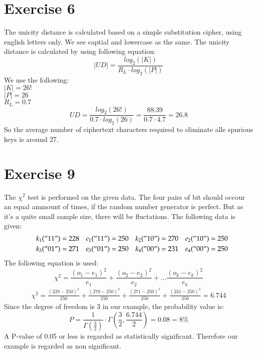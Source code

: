 \documentclass[a4paper,12pt]{article}
\begin{document}
\section*{Exercise 6}
The unicity distance is calculated based on a simple substitution cipher, using english letters only. We see captial and lowercase as the same. The unicity distance is calculated by using following equation:
\begin{equation}
|UD| = \frac{log_2(|K|)}{R_L  \cdot log_2(|P|)}
\end{equation}
We use the following:\\
$ |K| = 26!$\\
$ |P| = 26$\\
$ R_L = 0.7$\\	
\begin{equation}
UD=\frac{log_2(26!)}{0.7  \cdot log_2(26)}= \frac{88.39}{0.7 \cdot 4.7} = 26.8
\end{equation}
So the average number of ciphertext characters required to eliminate alle spurious keys is around 27.
\section*{Exercise 9}
The $ \chi^2 $ test is performed on the given data. The four pairs of bit should occour an equal ammount of times, if the random number generator is perfect. But as it's a quite small sample size, there will be fluctations. The following data is given:
\begin{align*}
k_1("11") = 228 \quad e_1("11") =250 \quad k_2("10") = 270 \quad e_2("10") =250 \\ \quad k_3("01") = 271 \quad e_3("01") =250 \quad k_4("00") = 231\quad e_4("00") =250
\end{align*}
The following equation is used:
\begin{equation}
\chi^2 = \frac{(o_1 - e_1)^2}{e_1}+\frac{(o_2 - e_2)^2}{e_2}+ \ldots \frac{(o_k - e_k)^2}{e_k}
\end{equation}
\begin{align*}
\chi^2 = \frac{(228 - 250)^2}{250}+\frac{(270 - 250)^2}{250}+\frac{(271 - 250)^2}{250}+\frac{(231 - 250)^2}{250}=6.744
\end{align*}
Since the degree of freedom is 3 in our example, the probability value is:
\begin{equation}
P=\frac{1}{\Gamma \left( \frac{3}{2} \right)}\cdot \Gamma \left( \frac{3}{2}, \frac{6.744}{2} \right) = 0.08 = 8\%
\end{equation}
A P-value of 0.05 or less is regarded as statistically significant. Therefore our example is regarded as non significant.
\newpage
\end{document}
